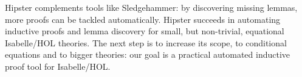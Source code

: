 Hipster complements tools like Sledgehammer: by discovering missing
lemmas, more proofs can be tackled automatically. Hipster succeeds in
automating inductive proofs and lemma discovery for small, but
non-trivial, equational Isabelle/HOL theories. The next step is to
increase its scope, to conditional equations and to bigger theories:
our goal is a practical automated inductive proof tool for Isabelle/HOL.


